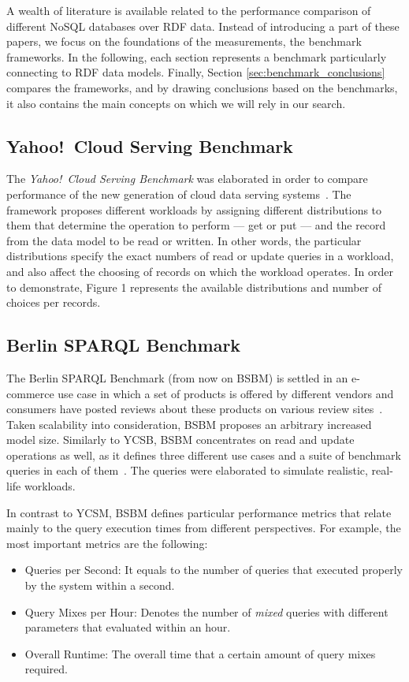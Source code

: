 A wealth of literature is available related to the performance comparison of different NoSQL databases over RDF data. Instead of introducing a part of these papers, we focus on the foundations of the measurements, the benchmark frameworks. In the following, each section represents a benchmark particularly connecting to RDF data models. Finally, Section \ref{sec:benchmark_conclusions} compares the frameworks, and by drawing conclusions based on the benchmarks, it also contains the main concepts on which we will rely in our search.

\subsection{Yahoo!~Cloud Serving Benchmark}

The \textit{Yahoo!~Cloud Serving Benchmark} was elaborated in order to compare performance of the new generation
of cloud data serving systems~\cite{ycsb}. The framework proposes different workloads by assigning
different distributions to them that determine the operation to perform --- get or put --- and the record from the data model to be read or written. In other words, the particular distributions specify the exact numbers of read or update queries in a workload, and also affect the choosing of records on which the workload operates. In order to demonstrate, Figure 1 %
represents the available distributions and number of choices per records.

\subsection{Berlin SPARQL Benchmark}

The Berlin SPARQL Benchmark (from now on BSBM) is settled in an e-commerce use case in which a set of products
is offered by different vendors and consumers have posted reviews about these products on various review sites~\cite{berlin}. Taken scalability into consideration, BSBM proposes an arbitrary increased model size. Similarly to YCSB, BSBM concentrates on read and update operations as well, as it defines three different use cases and a suite of benchmark queries in each of them~\cite{berlin_specification}. The queries were elaborated to simulate realistic, real-life workloads.

In contrast to YCSM, BSBM defines particular performance metrics that relate mainly to the query execution times from different perspectives. For example, the most important metrics are the following:
\begin{itemize}
	\item{Queries per Second}: It equals to the number of queries that executed properly by the system within a second.
	\item{Query Mixes per Hour}: Denotes the number of \textit{mixed} queries with different parameters that evaluated within an hour.
	\item{Overall Runtime}: The overall time that a certain amount of query mixes required.
\end{itemize}


